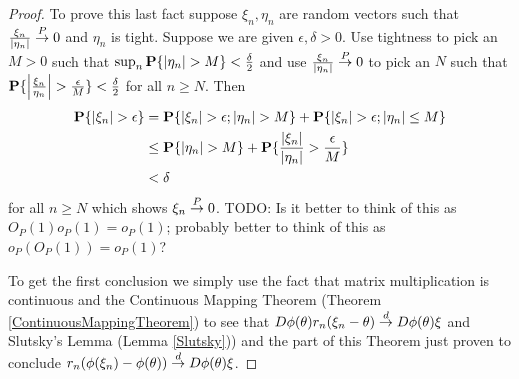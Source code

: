 \begin{proof}
To prove this last fact suppose $\xi_n, \eta_n$ are random vectors
such that $\frac{\xi_n}{\left \vert \eta_n \right \vert} \overset{P}\to 0$ and $\eta_n$ is
tight.  Suppose we are given $\epsilon, \delta > 0$.  Use tightness to
pick an $M>0$ such that $\sup_n \textbf{P}\{\left \vert \eta_n \right \vert > M\} <
\frac{\delta}{2}$ and use $\frac{\xi_n}{\left \vert \eta_n \right \vert} \overset{P}\to 0$ to
pick an $N$ such that $\textbf{P}\{\left \vert \frac{\xi_n}{\eta_n} \right \vert >
  \frac{\epsilon}{M}\} < \frac{\delta}{2}$ for all $n \geq N$.
Then
\begin{align*}
\textbf{P}\{\left \vert \xi_n \right \vert>\epsilon\} &=
\textbf{P}\{\left \vert \xi_n \right \vert>\epsilon ; \left \vert \eta_n \right \vert > M\} +
\textbf{P}\{\left \vert \xi_n \right \vert>\epsilon ; \left \vert \eta_n \right \vert \leq M\} \\
&\leq \textbf{P}\{\left \vert \eta_n \right \vert > M\} +
\textbf{P}\{\frac{\left \vert \xi_n \right \vert}{\left \vert \eta_n \right \vert}>\frac{\epsilon}{M}\} \\
&< \delta
\end{align*}
for all $n \geq N$ which shows $\xi_n \overset{P}\to 0$.  TODO: Is it better to
think of this as $O_P(1) o_P(1) = o_P(1)$; probably better to think of
this as $o_P(O_P(1)) = o_P(1)$?

To get the first conclusion we simply use the fact that matrix
multiplication is continuous and the Continuous Mapping Theorem
(Theorem \ref{ContinuousMappingTheorem}) to see
that $D\phi(\theta) r_n(\xi_n - \theta) \overset{d}\to D\phi(\theta) \xi$ and Slutsky's
Lemma (Lemma \ref{Slutsky})) and the part of this Theorem just proven
to conclude $r_n(\phi(\xi_n) - \phi(\theta)) \overset{d}\to D\phi(\theta) \xi$.
\end{proof}

